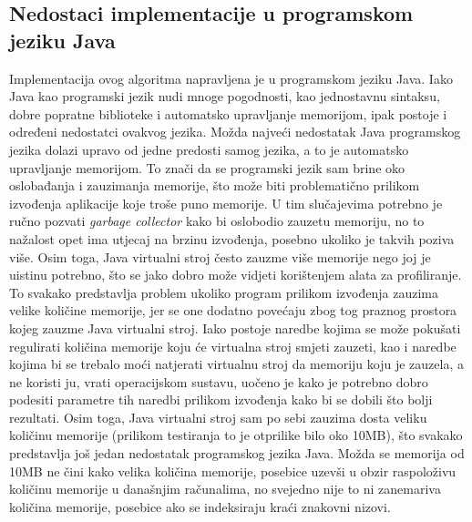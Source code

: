 \subsection{Nedostaci implementacije u programskom jeziku Java}
Implementacija ovog algoritma napravljena je u programskom jeziku Java.  Iako Java kao programski jezik nudi mnoge pogodnosti, kao jednostavnu sintaksu, dobre popratne biblioteke i automatsko upravljanje memorijom, ipak postoje i određeni nedostatci ovakvog jezika. Možda najveći nedostatak Java programskog jezika dolazi upravo od jedne predosti samog jezika, a to je automatsko upravljanje memorijom. To znači da se programski jezik sam brine oko oslobađanja i zauzimanja memorije, što može biti problematično prilikom izvođenja aplikacije koje troše puno memorije. U tim slučajevima potrebno je ručno pozvati \textit{garbage collector} kako bi oslobodio zauzetu memoriju, no to nažalost opet ima utjecaj na brzinu izvođenja, posebno ukoliko je takvih poziva više. Osim toga, Java virtualni stroj često zauzme više memorije nego joj je uistinu potrebno, što se jako dobro može vidjeti korištenjem alata za profiliranje. To svakako predstavlja problem ukoliko program prilikom izvođenja zauzima velike količine memorije, jer se one dodatno povećaju zbog tog praznog prostora kojeg zauzme Java virtualni stroj. Iako postoje naredbe kojima se može pokušati regulirati količina memorije koju će virtualna stroj smjeti zauzeti, kao i naredbe kojima bi se trebalo moći natjerati virtualnu stroj da memoriju koju je zauzela, a ne koristi ju, vrati operacijskom sustavu, uočeno je kako je potrebno dobro podesiti parametre tih naredbi prilikom izvođenja kako bi se dobili što bolji rezultati. Osim toga, Java virtualni stroj sam po sebi zauzima dosta veliku količinu memorije (prilikom testiranja to je otprilike bilo oko 10MB), što svakako predstavlja još jedan nedostatak programskog jezika Java. Možda se memorija od 10MB ne čini kako velika količina memorije, posebice uzevši u obzir raspoloživu količinu memorije u današnjim računalima, no svejedno nije to ni zanemariva količina memorije, posebice ako se indeksiraju kraći znakovni nizovi.

